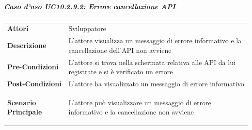 \subparagraph{Caso d'uso UC10.2.9.2: Errore cancellazione API}
\label{UC10_2_9_2}

\begin{minipage}{\linewidth}
	\begin{tabular}{ l | p{11cm}}
		\hline
		\rowcolor{Gray}
		\multicolumn{2}{c}{UC10.2.9.2 - Errore cancellazione API} \\
		\hline
		\textbf{Attori} & Sviluppatore \\
		\textbf{Descrizione} & L'attore visualizza un messaggio di errore informativo e la cancellazione dell'API non avviene \\
		\textbf{Pre-Condizioni} & L'attore si trova nella schermata relativa alle API da lui registrate e si è verificato un errore \\
		\textbf{Post-Condizioni} & L'attore ha visualizzato un messaggio di errore informativo \\
		\textbf{Scenario Principale} & 
		\begin{enumerate*}[label=(\arabic*.),itemjoin={\newline}]
			\item L'attore può visualizzare un messaggio di errore informativo e la cancellazione non avviene
		\end{enumerate*}\\
	\end{tabular}
\end{minipage}